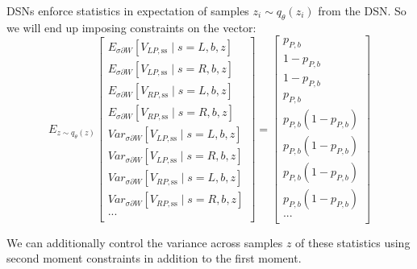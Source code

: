 \documentclass[11pt]{article}
\begin{document}
DSNs enforce statistics in expectation of samples $z_i \sim q_\theta(z_i)$ from the DSN.  So we will end up imposing constraints on the vector:
\begin{equation}
E_{z \sim q_\theta(z)}
\begin{bmatrix}
E_{\sigma \partial W} \left[ V_{LP,\text{ss}} \mid s=L, b, z \right] \\
E_{\sigma \partial W} \left[ V_{LP,\text{ss}} \mid s=R, b, z \right] \\
E_{\sigma \partial W} \left[ V_{RP,\text{ss}} \mid s=L, b, z \right] \\
E_{\sigma \partial W} \left[ V_{RP,\text{ss}} \mid s=R, b, z \right] \\
Var_{\sigma \partial W} \left[ V_{LP,\text{ss}} \mid s=L, b, z \right] \\
Var_{\sigma \partial W} \left[ V_{LP,\text{ss}} \mid s=R, b, z \right] \\
Var_{\sigma \partial W} \left[ V_{RP,\text{ss}} \mid s=L, b, z \right] \\
Var_{\sigma \partial W} \left[ V_{RP,\text{ss}} \mid s=R, b, z \right] \\
... \\
\end{bmatrix}
 = \begin{bmatrix}
p_{P, b} \\
1 - p_{P, b} \\
1 - p_{P, b} \\
p_{P, b} \\
p_{P, b}(1 - p_{P, b}) \\
p_{P, b}(1 - p_{P, b}) \\
p_{P, b}(1 - p_{P, b}) \\
p_{P, b}(1 - p_{P, b}) \\
... \\ 
\end{bmatrix}
\end{equation}

We can additionally control the variance across samples $z$ of these statistics using second moment constraints in addition to the first moment. 
\end{document}
